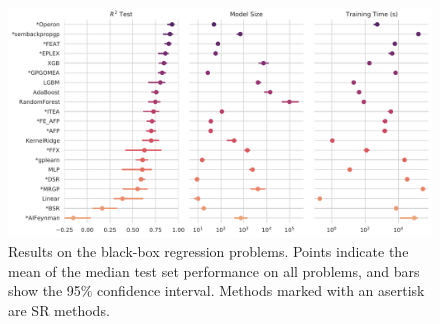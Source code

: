 \begin{figure}
    \includegraphics[width=\textwidth]{figs/results_pmlb_r1/pairgrid-pointplot_r2_test_model_size_training-time-(s).pdf}
    \caption{ 
        Results on the black-box regression problems.
        Points indicate the mean of the median test set performance on all problems, and bars show the 95\% confidence interval. 
        Methods marked with an asertisk are SR methods. 
    }
    \label{fig:pmlb_perf}
\end{figure}



